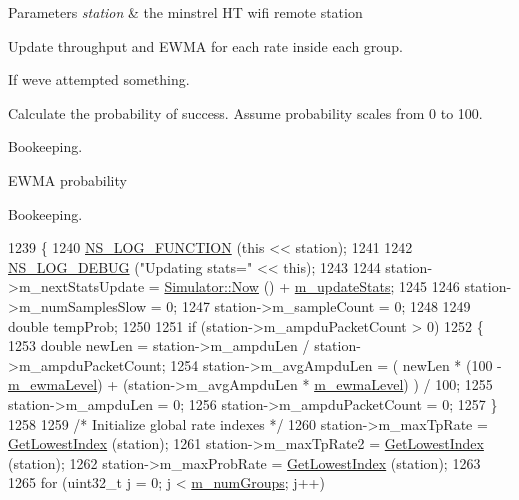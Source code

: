 \begin{DoxyParams}{Parameters}
{\em station} & the minstrel HT wifi remote station \\
\hline
\end{DoxyParams}
Update throughput and E\+W\+MA for each rate inside each group.

If we\textquotesingle{}ve attempted something.

Calculate the probability of success. Assume probability scales from 0 to 100.

Bookeeping.

E\+W\+MA probability

Bookeeping. 
\begin{DoxyCode}
1239 \{
1240   \hyperlink{log-macros-disabled_8h_a90b90d5bad1f39cb1b64923ea94c0761}{NS\_LOG\_FUNCTION} (\textcolor{keyword}{this} << station);
1241 
1242   \hyperlink{group__logging_ga413f1886406d49f59a6a0a89b77b4d0a}{NS\_LOG\_DEBUG} (\textcolor{stringliteral}{"Updating stats="} << \textcolor{keyword}{this});
1243 
1244   station->m\_nextStatsUpdate = \hyperlink{classns3_1_1Simulator_ac3178fa975b419f7875e7105be122800}{Simulator::Now} () + \hyperlink{classns3_1_1MinstrelHtWifiManager_a5c7d923b77d5cd3a1d38810ed41f91f8}{m\_updateStats};
1245 
1246   station->m\_numSamplesSlow = 0;
1247   station->m\_sampleCount = 0;
1248 
1249   \textcolor{keywordtype}{double} tempProb;
1250 
1251   \textcolor{keywordflow}{if} (station->m\_ampduPacketCount > 0)
1252     \{
1253       \textcolor{keywordtype}{double} newLen = station->m\_ampduLen / station->m\_ampduPacketCount;
1254       station->m\_avgAmpduLen = ( newLen * (100 - \hyperlink{classns3_1_1MinstrelHtWifiManager_ace0a340f6c702f416f3dc9fed71105d1}{m\_ewmaLevel}) + (station->m\_avgAmpduLen * 
      \hyperlink{classns3_1_1MinstrelHtWifiManager_ace0a340f6c702f416f3dc9fed71105d1}{m\_ewmaLevel}) ) / 100;
1255       station->m\_ampduLen = 0;
1256       station->m\_ampduPacketCount = 0;
1257     \}
1258 
1259   \textcolor{comment}{/* Initialize global rate indexes */}
1260   station->m\_maxTpRate = \hyperlink{classns3_1_1MinstrelHtWifiManager_ae4e498be04ca255831cdf42d9ff24eec}{GetLowestIndex} (station);
1261   station->m\_maxTpRate2 = \hyperlink{classns3_1_1MinstrelHtWifiManager_ae4e498be04ca255831cdf42d9ff24eec}{GetLowestIndex} (station);
1262   station->m\_maxProbRate = \hyperlink{classns3_1_1MinstrelHtWifiManager_ae4e498be04ca255831cdf42d9ff24eec}{GetLowestIndex} (station);
1263 
1265   \textcolor{keywordflow}{for} (uint32\_t j = 0; j < \hyperlink{classns3_1_1MinstrelHtWifiManager_a8a0964148ee665bab466b2858e8094b7}{m\_numGroups}; j++)

\end{DoxyCode}
